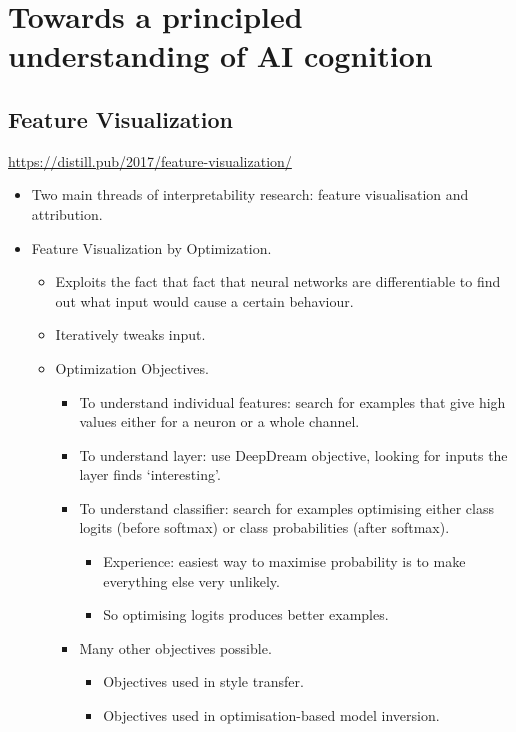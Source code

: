 
\chapter{Towards a principled understanding of AI cognition}

\section{Feature Visualization}

\url{https://distill.pub/2017/feature-visualization/}

\begin{itemize}
    \item Two main threads of interpretability research: feature visualisation and attribution.
    \item Feature Visualization by Optimization.
    \begin{itemize}
        \item Exploits the fact that fact that neural networks are differentiable to find out what input would cause a certain behaviour.
        \item Iteratively tweaks input.
        \item Optimization Objectives.
        \begin{itemize}
            \item To understand individual features: search for examples that give high values either for a neuron or a whole channel.
            \item To understand layer: use DeepDream objective, looking for inputs the layer finds `interesting'.
            \item To understand classifier: search for examples optimising either class logits (before softmax) or class probabilities (after softmax).
            \begin{itemize}
                \item Experience: easiest way to maximise probability is to make everything else very unlikely.
                \item So optimising logits produces better examples.
            \end{itemize}
            \item Many other objectives possible.
            \begin{itemize}
                \item Objectives used in style transfer.
                \item Objectives used in optimisation-based model inversion.

\end{itemize}
\end{itemize}
\end{itemize}
\end{itemize}
